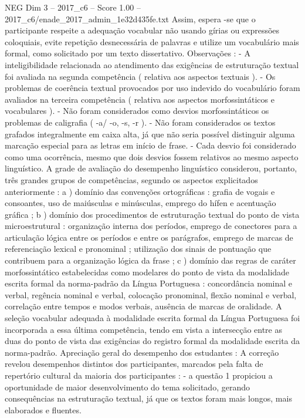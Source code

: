 \begin{textsample}{NEG Dim 3 – 2017\_c6 – Score 1.00 – 2017\_c6/enade\_2017\_admin\_1e32d435fe.txt}
Assim, espera -se que o participante respeite a adequação vocabular não usando gírias ou expressões coloquiais, evite repetição desnecessária de palavras e utilize um vocabulário mais formal, como solicitado por um texto dissertativo.
Observações : - A inteligibilidade relacionada ao atendimento das exigências de estruturação textual foi avaliada na segunda competência ( relativa aos aspectos textuais ). - Os problemas de coerência textual provocados por uso indevido do vocabulário foram avaliados na terceira competência ( relativa aos aspectos morfossintáticos e vocabulares ). - Não foram considerados como desvios morfossintáticos os problemas de caligrafia ( -a/ -o, -s, -r ). - Não foram considerados os textos grafados integralmente em caixa alta, já que não seria possível distinguir alguma marcação especial para as letras em início de frase. - Cada desvio foi considerado como uma ocorrência, mesmo que dois desvios fossem relativos ao mesmo aspecto linguístico.
A grade de avaliação do desempenho linguístico considerou, portanto, três grandes grupos de competências, segundo os aspectos explicitados anteriormente : a ) domínio das convenções ortográficas : grafia de vogais e consoantes, uso de maiúsculas e minúsculas, emprego do hífen e acentuação gráfica ; b ) domínio dos procedimentos de estruturação textual do ponto de vista microestrutural : organização interna dos períodos, emprego de conectores para a articulação lógica entre os períodos e entre os parágrafos, emprego de marcas de referenciação lexical e pronominal ; utilização dos sinais de pontuação que contribuem para a organização lógica da frase ; c ) domínio das regras de caráter morfossintático estabelecidas como modelares do ponto de vista da modalidade escrita formal da norma-padrão da Língua Portuguesa : concordância nominal e verbal, regência nominal e verbal, colocação pronominal, flexão nominal e verbal, correlação entre tempos e modos verbais, ausência de marcas de oralidade.
A seleção vocabular adequada à modalidade escrita formal da Língua Portuguesa foi incorporada a essa última competência, tendo em vista a intersecção entre as duas do ponto de vista das exigências do registro formal da modalidade escrita da norma-padrão.
Apreciação geral do desempenho dos estudantes : A correção revelou desempenhos distintos dos participantes, marcados pela falta de repertório cultural da maioria dos participantes : - a questão 1 propiciou a oportunidade de maior desenvolvimento do tema solicitado, gerando consequências na estruturação textual, já que os textos foram mais longos, mais elaborados e fluentes.

\end{textsample}
